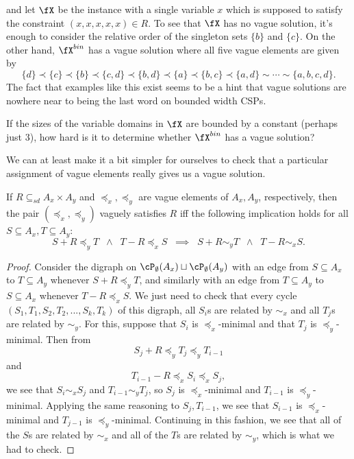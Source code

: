 \begin{ex}
\[\]
and let $\fX$ be the instance with a single variable $x$ which is supposed to satisfy the constraint $(x,x,x,x,x) \in R$. To see that $\fX$ has no vague solution, it's enough to consider the relative order of the singleton sets $\{b\}$ and $\{c\}$. On the other hand, $\fX^{bin}$ has a vague solution where all five vague elements are given by
\[
\{d\} \prec \{c\} \prec \{b\} \prec \{c,d\} \prec \{b,d\} \prec \{a\} \prec \{b,c\} \prec \{a,d\} \sim \cdots \sim \{a,b,c,d\}.
\]
The fact that examples like this exist seems to be a hint that vague solutions are nowhere near to being the last word on bounded width CSPs.
\end{ex}

\begin{prob} If the sizes of the variable domains in $\fX$ are bounded by a constant (perhaps just $3$), how hard is it to determine whether $\fX^{bin}$ has a vague solution?
\end{prob}

We can at least make it a bit simpler for ourselves to check that a particular assignment of vague elements really gives us a vague solution.

\begin{prop} If $R \subseteq_{sd} A_x \times A_y$ and $\preceq_x, \preceq_y$ are vague elements of $A_x, A_y$, respectively, then the pair $(\preceq_x,\preceq_y)$ vaguely satisfies $R$ iff the following implication holds for all $S \subseteq A_x, T \subseteq A_y$:
\[
S + R \preceq_y T \;\; \wedge \;\; T - R \preceq_x S \;\; \implies \;\; S + R \sim_y T \;\; \wedge \;\; T - R \sim_x S.
\]
\end{prop}
\begin{proof} Consider the digraph on $\cP_\emptyset(A_x) \sqcup \cP_\emptyset(A_y)$ with an edge from $S \subseteq A_x$ to $T \subseteq A_y$ whenever $S + R \preceq_y T$, and similarly with an edge from $T \subseteq A_y$ to $S \subseteq A_x$ whenever $T - R \preceq_x S$. We just need to check that every cycle $(S_1, T_1, S_2, T_2, ..., S_k, T_k)$ of this digraph, all $S_i$s are related by $\sim_x$ and all $T_j$s are related by $\sim_y$. For this, suppose that $S_i$ is $\preceq_x$-minimal and that $T_j$ is $\preceq_y$-minimal. Then from
\[
S_j + R \preceq_y T_j \preceq_y T_{i-1}
\]
and
\[
T_{i-1} - R \preceq_x S_i \preceq_x S_j,
\]
we see that $S_i \sim_x S_j$ and $T_{i-1} \sim_y T_j$, so $S_j$ is $\preceq_x$-minimal and $T_{i-1}$ is $\preceq_y$-minimal. Applying the same reasoning to $S_j, T_{i-1}$, we see that $S_{i-1}$ is $\preceq_x$-minimal and $T_{j-1}$ is $\preceq_y$-minimal. Continuing in this fashion, we see that all of the $S$s are related by $\sim_x$ and all of the $T$s are related by $\sim_y$, which is what we had to check.
\end{proof}

